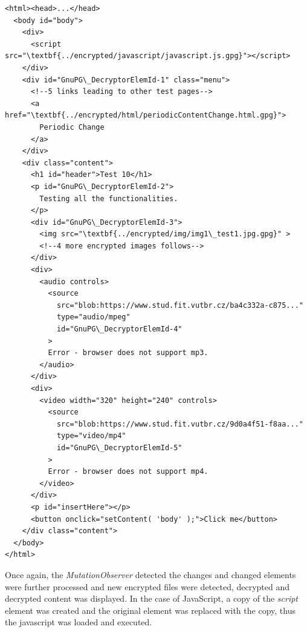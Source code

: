 \begin{Verbatim}[commandchars=\\\{\},codes={\catcode`$=3\catcode`_=8},samepage=false,frame=single]
<html><head>...</head>
  <body id="body">
    <div>
      <script src="\textbf{../encrypted/javascript/javascript.js.gpg}"></script>
    </div>
    <div id="GnuPG\_DecryptorElemId-1" class="menu">
      <!--5 links leading to other test pages-->
      <a href="\textbf{../encrypted/html/periodicContentChange.html.gpg}">
        Periodic Change
      </a>
    </div>
    <div class="content">
      <h1 id="header">Test 10</h1>
      <p id="GnuPG\_DecryptorElemId-2">
        Testing all the functionalities.
      </p>
      <div id="GnuPG\_DecryptorElemId-3">
        <img src="\textbf{../encrypted/img/img1\_test1.jpg.gpg}" >
        <!--4 more encrypted images follows-->
      </div>
      <div>
        <audio controls>
          <source
            src="blob:https://www.stud.fit.vutbr.cz/ba4c332a-c875..."
            type="audio/mpeg"
            id="GnuPG\_DecryptorElemId-4"
          >
          Error - browser does not support mp3.
        </audio>
      </div>
      <div>
        <video width="320" height="240" controls>
          <source
            src="blob:https://www.stud.fit.vutbr.cz/9d0a4f51-f8aa..."
            type="video/mp4"
            id="GnuPG\_DecryptorElemId-5"
          >
          Error - browser does not support mp4.
        </video>
      </div>
      <p id="insertHere"></p>
      <button onclick="setContent( 'body' );">Click me</button>
    </div class="content">
  </body>
</html>
\end{Verbatim}

Once again, the \textit{MutationObserver} detected the changes and changed elements were further processed and new encrypted files were detected, decrypted and decrypted content was displayed. In the case of JavaScript, a copy of the \textit{script} element was created and the original element was replaced with the copy, thus the javascript was loaded and executed.

